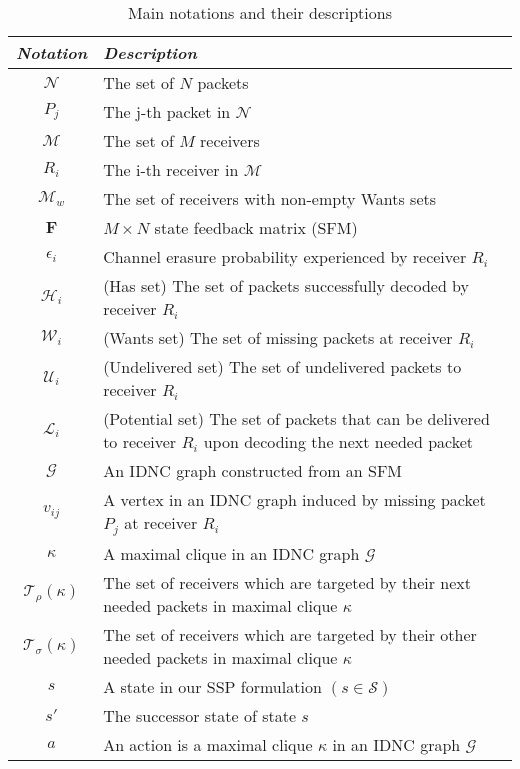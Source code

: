 \documentclass[12pt, peerreview, onecolumn]{IEEEtran}
\begin{document}
\begin{table}\caption{Main notations and their descriptions}
 \centering
    \begin{tabular}{|c| p{15.5cm}|}
    \hline
    \textit{Notation} &  \textit{Description} \\ \hline
    $\mathcal{N}$ & The set of $N$ packets \\ \hline
    $P_j$ &  The j-th packet in $\mathcal{N}$\\ \hline
    $\mathcal{M}$ & The set of $M$ receivers \\ \hline
    $R_i$ & The i-th receiver in $\mathcal{M}$\\ \hline
    $\mathcal{M}_w$ & The set of receivers with non-empty Wants sets \\ \hline
    $\mathbf{F}$ & $M \times N$ state feedback matrix (SFM)\\ \hline
    $\epsilon_i$ & Channel erasure probability experienced by receiver $R_i$ \\ \hline
    $\mathcal{H}_i$ & (Has set) The set of packets successfully decoded by  receiver $R_i$  \\ \hline
    $\mathcal{W}_i$ & (Wants set) The set of missing packets at receiver $R_i$ \\ \hline
    $\mathcal{U}_i$ & (Undelivered set) The set of undelivered packets to receiver $R_i$ \\ \hline
    $\mathcal{L}_i$ & (Potential set) The set of  packets that can be delivered to receiver $R_i$ upon decoding the next needed packet \\ \hline
    $\mathcal{G}$ & An IDNC graph constructed from an SFM \\ \hline
    $v_{ij}$ & A  vertex in an IDNC graph induced by  missing packet $P_j$ at receiver $R_i$\\ \hline
    $\kappa$ & A maximal clique in an IDNC graph $\mathcal{G}$\\ \hline
    $\mathcal{T}_{\rho}(\kappa)$ & The set of  receivers which are  targeted by their next needed packets in  maximal clique $\kappa$\\ \hline
    $\mathcal{T}_{\sigma}(\kappa)$ & The set of  receivers which are  targeted by their other needed packets in  maximal clique $\kappa$\\ \hline
    $s$ & A state  in our SSP formulation $(s \in \mathcal{S})$ \\ \hline
     $s'$ & The successor state of state $s$ \\ \hline
    $a$ & An action is a maximal clique $\kappa$ in an IDNC graph $\mathcal{G}$ \\ \hline

\end{tabular}
\end{table}
\end{document}

